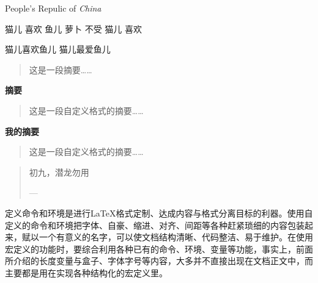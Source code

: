 \documentclass{ctexart}
\newcommand\PRC{People's Repulic of \emph{China}}
\newcommand\loves[2]{#1 喜欢 #2}
\newcommand\hateby[2]{#2 不受 #1 喜欢}
\newcommand\love[3][喜欢]{#2#1#3} %
\newenvironment{myabstract}[1][摘要]{\small
										\begin{center}
											\bfseries #1
										\end{center}
										\begin{quotation}} %
									{\end{quotation}}
\newenvironment{Quotation}[1]{\newcommand\quotesource{#1}
											\begin{quotation}}
												{\par\hfill---\textit{\quotesource}
											\end{quotation}}
\begin{document}
	\PRC
	
	\loves{猫儿}{鱼儿}
	\hateby{猫儿}{萝卜}
	
	\love{猫儿}{鱼儿} %
	\love[最爱]{猫儿}{鱼儿} %
	
	\begin{abstract}
		这是一段摘要……
	\end{abstract}

	\begin{myabstract}
		这是一段自定义格式的摘要……
	\end{myabstract}

	\begin{myabstract}[我的摘要]
		这是一段自定义格式的摘要……
	\end{myabstract}

	\begin{Quotation}{易$\cdot$乾}
		初九，潜龙勿用
	\end{Quotation}

	定义命令和环境是进行\LaTeX{}格式定制、达成内容与格式分离目标的利器。使用自定义的命令和环境把字体、自豪、缩进、对齐、间距等各种赶紧琐细的内容包装起来，赋以一个有意义的名字，可以使文档结构清晰、代码整洁、易于维护。在使用宏定义的功能时，要综合利用各种已有的命令、环境、变量等功能，事实上，前面所介绍的长度变量与盒子、字体字号等内容，大多并不直接出现在文档正文中，而主要都是用在实现各种结构化的宏定义里。
	
\end{document}
